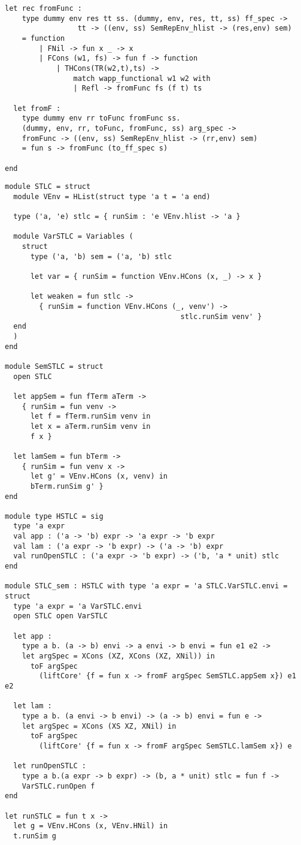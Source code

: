 \documentclass[uplatex]{sumiilab-paper}
\theoremstyle{mystyle}
\numberwithin{definition}{chapter} %
\begin{document}
\begin{lstlisting}[caption=OCaml版EbUの実装,label=src:unembedding_ocaml]
  let rec fromFunc : 
    type dummy env res tt ss. (dummy, env, res, tt, ss) ff_spec -> 
                 tt -> ((env, ss) SemRepEnv_hlist -> (res,env) sem) 
    = function 
        | FNil -> fun x _ -> x 
        | FCons (w1, fs) -> fun f -> function 
            | THCons(TR(w2,t),ts) -> 
                match wapp_functional w1 w2 with 
                | Refl -> fromFunc fs (f t) ts 
                      
  let fromF : 
    type dummy env rr toFunc fromFunc ss. 
    (dummy, env, rr, toFunc, fromFunc, ss) arg_spec -> 
    fromFunc -> ((env, ss) SemRepEnv_hlist -> (rr,env) sem) 
    = fun s -> fromFunc (to_ff_spec s) 

end
\end{lstlisting}

\begin{lstlisting}[caption=STLCの埋め込み,label=src:stlc_unembedding]
module STLC = struct
  module VEnv = HList(struct type 'a t = 'a end)

  type ('a, 'e) stlc = { runSim : 'e VEnv.hlist -> 'a }

  module VarSTLC = Variables (
    struct 
      type ('a, 'b) sem = ('a, 'b) stlc 

      let var = { runSim = function VEnv.HCons (x, _) -> x }
    
      let weaken = fun stlc -> 
        { runSim = function VEnv.HCons (_, venv') -> 
                                         stlc.runSim venv' }
  end 
  )
end
  
module SemSTLC = struct
  open STLC
  
  let appSem = fun fTerm aTerm ->
    { runSim = fun venv -> 
      let f = fTerm.runSim venv in
      let x = aTerm.runSim venv in
      f x }
  
  let lamSem = fun bTerm ->
    { runSim = fun venv x ->
      let g' = VEnv.HCons (x, venv) in 
      bTerm.runSim g' }    
end

module type HSTLC = sig
  type 'a expr 
  val app : ('a -> 'b) expr -> 'a expr -> 'b expr
  val lam : ('a expr -> 'b expr) -> ('a -> 'b) expr
  val runOpenSTLC : ('a expr -> 'b expr) -> ('b, 'a * unit) stlc
end

module STLC_sem : HSTLC with type 'a expr = 'a STLC.VarSTLC.envi = 
struct 
  type 'a expr = 'a VarSTLC.envi
  open STLC open VarSTLC 

  let app : 
    type a b. (a -> b) envi -> a envi -> b envi = fun e1 e2 -> 
    let argSpec = XCons (XZ, XCons (XZ, XNil)) in
      toF argSpec 
        (liftCore' {f = fun x -> fromF argSpec SemSTLC.appSem x}) e1 e2

  let lam : 
    type a b. (a envi -> b envi) -> (a -> b) envi = fun e ->
    let argSpec = XCons (XS XZ, XNil) in 
      toF argSpec 
        (liftCore' {f = fun x -> fromF argSpec SemSTLC.lamSem x}) e

  let runOpenSTLC : 
    type a b.(a expr -> b expr) -> (b, a * unit) stlc = fun f ->
    VarSTLC.runOpen f    
end 

let runSTLC = fun t x ->
  let g = VEnv.HCons (x, VEnv.HNil) in 
  t.runSim g

\end{lstlisting}
\end{document}
